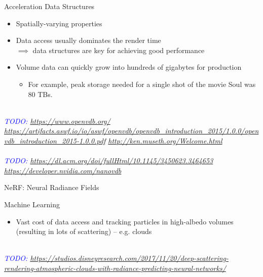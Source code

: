 \documentclass[
  english,            %
  aspectratio=169,    %
]{tumbeamer}
\newcommand\todo[1]{\textit{\textcolor{blue}{\\TODO: #1\\}}}
\begin{document}
\begin{frame}{Acceleration Data Structures}
  \begin{itemize}
    \item Spatially-varying properties
    \item Data access usually dominates the render time \\
    $\implies$ data structures are key for achieving good performance
    \item Volume data can quickly grow into hundreds of gigabytes for production
        \begin{itemize}
            \item For example, peak storage needed for a single shot of the
              movie Soul was 80 TBs.\cite{PixarSoul}
        \end{itemize}
  \end{itemize}
  \todo{
    \url{https://www.openvdb.org/}
    \url{https://artifacts.aswf.io/io/aswf/openvdb/openvdb_introduction_2015/1.0.0/openvdb_introduction_2015-1.0.0.pdf}
    \url{http://ken.museth.org/Welcome.html}
  }
  \todo{
    \url{https://dl.acm.org/doi/fullHtml/10.1145/3450623.3464653}
    \url{https://developer.nvidia.com/nanovdb}
  }
\end{frame}


\begin{frame}{NeRF: Neural Radiance Fields}
\end{frame}

\begin{frame}{Machine Learning}
  \begin{itemize}
      \item Vast cost of data access and tracking particles
          in high-albedo volumes (resulting in lots of scattering) --
          e.g. clouds
  \end{itemize}
  \todo{\url{https://studios.disneyresearch.com/2017/11/20/deep-scattering-rendering-atmospheric-clouds-with-radiance-predicting-neural-networks/}}
\end{frame}
\end{document}

